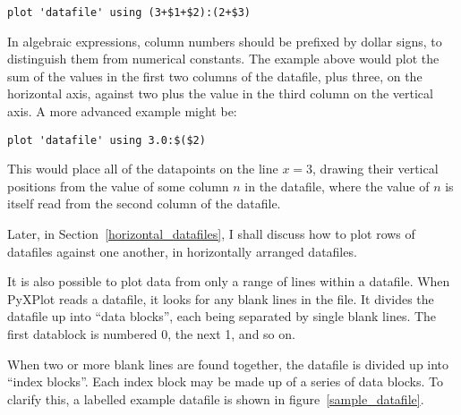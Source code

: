 \documentclass[a4paper,onecolumn,11pt]{book}
\begin{document}
\begin{verbatim}
plot 'datafile' using (3+$1+$2):(2+$3)
\end{verbatim}

\noindent In algebraic expressions, column numbers should be prefixed by dollar
signs, to distinguish them from numerical constants. The example above would
plot the sum of the values in the first two columns of the datafile, plus
three, on the horizontal axis, against two plus the value in the third column
on the vertical axis. A more advanced example might be:

\begin{verbatim}
plot 'datafile' using 3.0:$($2)
\end{verbatim}

\noindent This would place all of the datapoints on the line $x=3$, drawing
their vertical positions from the value of some column $n$ in the datafile,
where the value of $n$ is itself read from the second column of the datafile.

Later, in Section~\ref{horizontal_datafiles}, I shall discuss how to plot rows
of datafiles against one another, in horizontally arranged datafiles.

It is also possible to plot data from only a range of lines within a datafile.
When PyXPlot reads a datafile, it looks for any blank lines in the file. It
divides the datafile up into ``data blocks'', each being separated by single
blank lines. The first datablock is numbered 0, the next 1, and so on.

When two or more blank lines are found together, the datafile is divided up
into ``index blocks''. Each index block may be made up of a series of data
blocks. To clarify this, a labelled example datafile is shown in
figure~\ref{sample_datafile}.
\end{document}
